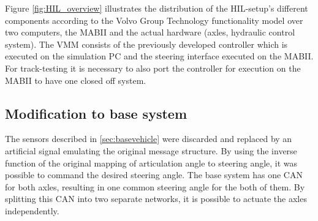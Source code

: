 \documentclass[root.tex]{subfiles}
\begin{document}
 Figure \ref{fig:HIL_overview} illustrates the distribution of the \gls{HIL}-setup's different components according to the Volvo Group Technology functionality model \cite{nilsson2015traffic} over two computers, the \gls{MABII} and the actual hardware (axles, hydraulic control system). The \gls{VMM} consists of the previously developed controller which is executed on the simulation PC and the steering interface executed on the \gls{MABII}. For track-testing it is necessary to also port the controller for execution on the \gls{MABII} to have one closed off system. %




\subsection{Modification to base system}
The sensors described in \ref{sec:basevehicle} were discarded and replaced by an artificial signal emulating the original message structure. By using the inverse  function of the original mapping of articulation angle to steering angle, it was possible to command the desired steering angle. The base system has one \gls{CAN} for both axles, resulting in one common steering angle for the both of them. By splitting this \gls{CAN} into two separate networks, it is possible to actuate the axles independently. 
\end{document}
